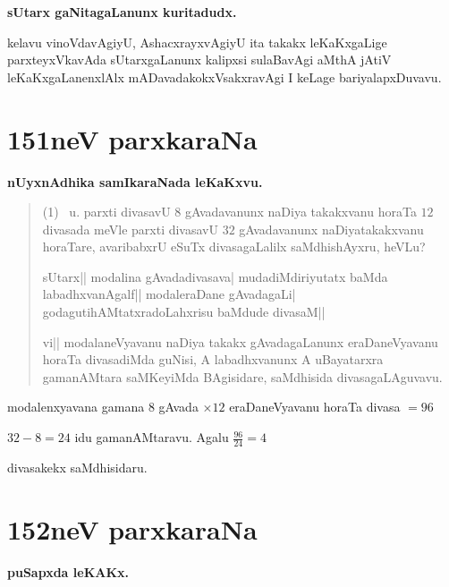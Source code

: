 \begin{center}
{\large\bf sUtarx gaNitagaLanunx kuritadudx.}
\end{center}

kelavu vinoVdavAgiyU, AshacxrayxvAgiyU ita takakx leKaKxgaLige
parxteyxVkavAda sUtarxgaLanunx kalipxsi sulaBavAgi aMthA jAtiV
leKaKxgaLanenxlAlx mADavadakokxVsakxravAgi I keLage bariyalapxDuvavu.



\chapter{151neV parxkaraNa}

\begin{center}
{\large\bf nUyxnAdhika samIkaraNada leKaKxvu.}
\end{center}

\begin{verse}
{\rm(1)}~ u. parxti divasavU $8$ gAvadavanunx naDiya takakxvanu horaTa
$12$ divasada meVle parxti divasavU $32$ gAvadavanunx naDiyatakakxvanu
horaTare, avaribabxrU eSuTx divasagaLalilx saMdhishAyxru, heVLu?

sUtarx|| modalina gAvadadivasava| mudadiMdiriyutatx baMda
labadhxvanAgalf|| modaleraDane gAvadagaLi| godagutihAMtatxradoLahxrisu
baMdude divasaM||

vi|| modalaneVyavanu naDiya takakx gAvadagaLanunx eraDaneVyavanu
horaTa divasadiMda guNisi, A labadhxvanunx A uBayatarxra gamanAMtara
saMKeyiMda BAgisidare, saMdhisida divasagaLAguvavu.
\end{verse}

\hfill modalenxyavana gamana $8$ gAvada $\times 12$ eraDaneVyavanu horaTa
divasa $=96$

\hfill $32-8=24$ idu gamanAMtaravu. Agalu $\frac{96}{24}=4$

\hfill divasakekx saMdhisidaru.


\chapter{152neV parxkaraNa}

\begin{center}
{\large\bf puSapxda leKAKx.}
\end{center}

